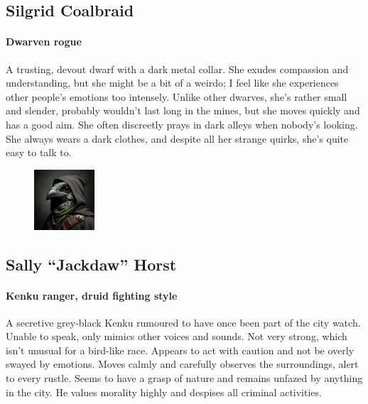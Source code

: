 \documentclass[10pt,onecolumn,twoside,openany,bg=full,layout=true]{dndbook}
\begin{document}
  \subsection{Silgrid Coalbraid}\label{subsec:silgrid-coalbraid}

  \paragraph{Dwarven rogue} A trusting, devout dwarf with a dark metal collar.
  She exudes compassion and understanding, but she might be a bit of a weirdo; I feel like she experiences other
  people's emotions too intensely.
  Unlike other dwarves, she's rather small and slender, probably wouldn't last long
  in the mines, but she moves quickly and has a good aim.
  She often discreetly prays in dark alleys when nobody's looking.
  She always wears a dark clothes, and despite all her strange quirks, she's quite easy to talk to.


  \begin{figure}
    \begin{center}
      \includegraphics[width=0.2\textwidth]{img/sally}
    \end{center}
  \end{figure}
  \subsection{Sally “Jackdaw” Horst}\label{subsec:sally-jackdaw-horst}

  \paragraph{Kenku ranger, druid fighting style}
  A secretive grey-black Kenku rumoured to have once been part of the city watch.
  Unable to speak, only mimics other voices and sounds.
  Not very strong, which isn't unusual for a bird-like race.
  Appears to act with caution and not be overly swayed by emotions.
  Moves calmly and carefully observes the surroundings, alert to every rustle.
  Seems to have a grasp of nature and remains unfazed by anything in the city.
  He values morality highly and despises all criminal activities.
\end{document}
